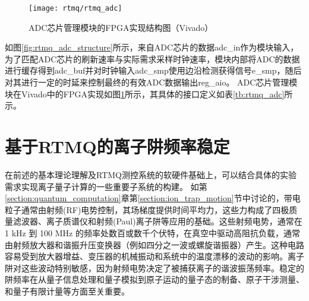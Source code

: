 \begin{figure}
    \centering
    \texttt{[image: rtmq/rtmq\_adc]}
    \caption[ADC芯片管理模块的FPGA实现结构图]{ADC芯片管理模块的FPGA实现结构图（Vivado）\label{fig:rtmq_adc}}
\end{figure}


如图\ref{fig:rtmq_adc_structure}所示，来自ADC芯片的数据adc\_in作为模块输入，为了匹配ADC芯片的刷新速率与实际需求采样时钟速率，模块内部将ADC的数据进行缓存得到adc\_buf并对时钟输入adc\_smp使用边沿检测获得信号e\_smp，随后对其进行一定的时延来控制最终的有效ADC数据输出reg\_aio。
ADC芯片管理模块在Vivado中的FPGA实现如图\ref{fig:rtmq_adc}所示，其具体的接口定义如表\ref{tb:rtmq_adc}所示。







\section[基于RTMQ的离子阱频率稳定]{基于RTMQ的离子阱频率稳定\label{section:trap_frequency_stablization}}

在前述的基本理论理解及RTMQ测控系统的软硬件基础上，可以结合具体的实验需求实现离子量子计算的一些重要子系统的构建。
如第\ref{section:quantum_computation}章第\ref{section:ion_trap_motion}节中讨论的，带电粒子通常由射频(RF)电势控制，其场梯度提供时间平均力，这些力构成了四极质量滤波器、离子质谱仪和射频(Paul)离子阱等应用的基础\cite[]{Dehmelt_1990, Paul_1990}。这些射频电势，通常在 1 kHz 到 100 MHz 的频率处数百或数千个伏特，在真空中驱动高阻抗负载，通常由射频放大器和谐振升压变换器（例如四分之一波或螺旋谐振器）产生\cite[]{Siverns_Simkins_Weidt_Hensinger_2012}。这种电路容易受到放大器增益、变压器的机械振动和系统中的温度漂移的波动的影响。离子阱对这些波动特别敏感，因为射频电势决定了被捕获离子的谐波振荡频率。稳定的阱频率在从量子信息处理\cite[]{Blatt_Wineland_2008, Monroe_Kim_2013}和量子模拟\cite[]{Richerme_Gong_Lee_Senko_Smith_Foss_Feig_Michalakis_Gorshkov_Monroe_2014, Jurcevic_Lanyon_Hauke_Hempel_Zoller_Blatt_Roos_2014}到原子运动的量子态的制备\cite[]{Leibfried_Blatt_Monroe_Wineland_2003}、原子干涉测量\cite[]{Johnson_Neyenhuis_Mizrahi_Wong_Campos_Monroe_2015}、和量子有限计量\cite[]{Chou_Hume_Koelemeij_Wineland_Rosenband_2010}等方面至关重要。


